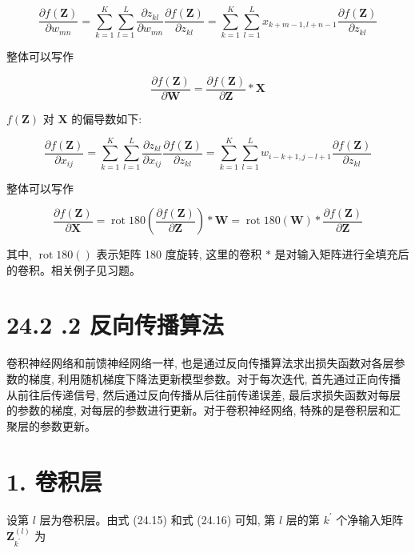 \documentclass[10pt]{article}
\begin{document}
\begin{equation*}
\frac{\partial f(\boldsymbol{Z})}{\partial w_{m n}}=\sum_{k=1}^{K} \sum_{l=1}^{L} \frac{\partial z_{k l}}{\partial w_{m n}} \frac{\partial f(\boldsymbol{Z})}{\partial z_{k l}}=\sum_{k=1}^{K} \sum_{l=1}^{L} x_{k+m-1, l+n-1} \frac{\partial f(\boldsymbol{Z})}{\partial z_{k l}} \tag{24.20}
\end{equation*}


整体可以写作


\begin{equation*}
\frac{\partial f(\boldsymbol{Z})}{\partial \boldsymbol{W}}=\frac{\partial f(\boldsymbol{Z})}{\partial \boldsymbol{Z}} * \boldsymbol{X} \tag{24.21}
\end{equation*}


$f(\boldsymbol{Z})$ 对 $\boldsymbol{X}$ 的偏导数如下:


\begin{equation*}
\frac{\partial f(\boldsymbol{Z})}{\partial x_{i j}}=\sum_{k=1}^{K} \sum_{l=1}^{L} \frac{\partial z_{k l}}{\partial x_{i j}} \frac{\partial f(\boldsymbol{Z})}{\partial z_{k l}}=\sum_{k=1}^{K} \sum_{l=1}^{L} w_{i-k+1, j-l+1} \frac{\partial f(\boldsymbol{Z})}{\partial z_{k l}} \tag{24.22}
\end{equation*}


整体可以写作


\begin{equation*}
\frac{\partial f(\boldsymbol{Z})}{\partial \boldsymbol{X}}=\operatorname{rot} 180\left(\frac{\partial f(\boldsymbol{Z})}{\partial \boldsymbol{Z}}\right) * \boldsymbol{W}=\operatorname{rot} 180(\boldsymbol{W}) * \frac{\partial f(\boldsymbol{Z})}{\partial \boldsymbol{Z}} \tag{24.23}
\end{equation*}


其中, $\operatorname{rot} 180()$ 表示矩阵 180 度旋转, 这里的卷积 $*$ 是对输入矩阵进行全填充后的卷积。相关例子见习题。

\section*{24.2 .2 反向传播算法}
卷积神经网络和前馈神经网络一样, 也是通过反向传播算法求出损失函数对各层参数的梯度, 利用随机梯度下降法更新模型参数。对于每次迭代, 首先通过正向传播从前往后传递信号, 然后通过反向传播从后往前传递误差, 最后求损失函数对每层的参数的梯度, 对每层的参数进行更新。对于卷积神经网络, 特殊的是卷积层和汇聚层的参数更新。

\section*{1. 卷积层}
设第 $l$ 层为卷积层。由式 (24.15) 和式 (24.16) 可知, 第 $l$ 层的第 $k^{\prime}$ 个净输入矩阵 $\boldsymbol{Z}_{k^{\prime}}^{(l)}$ 为
\end{document}
